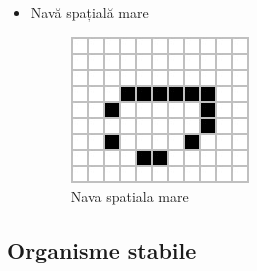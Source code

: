 \documentclass[11pt ,A4]{article}
\begin{document}
\begin{itemize}
                    \item Navă spațială mare
                        \begin{figure}[H]
                            \centering
                            \includegraphics[scale=0.7]{organisme/nave/navaMare}
                            \caption{Nava spatiala mare}
                        \end{figure}

                \end{itemize}
                
            \subsection{Organisme stabile}
\end{document}

